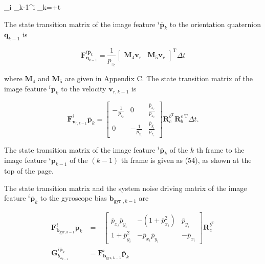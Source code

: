 _{i _{k-1}}^i _k=+ \Delta t


The state transition matrix of the image feature ${ }^i \overline{\mathbf{p}}_k$ to the orientation quaternion $\mathbf{q}_{k-1}$ is

$$
\mathbf{F}_{\mathbf{q}_{k-1}}^{i \overline{\mathbf{p}}_k}=\frac{1}{p_{z_c}}\left[\begin{array}{ll}
\mathbf{M}_4 \mathbf{v}_r & \mathbf{M}_5 \mathbf{v}_r
\end{array}\right]^{\mathrm{T}} \Delta t
$$

where $\mathbf{M}_4$ and $\mathbf{M}_5$ are given in Appendix C.
The state transition matrix of the image feature ${ }^i \overline{\mathbf{p}}_k$ to the velocity $\mathbf{v}_{r, k-1}$ is

$$
\mathbf{F}_{\mathbf{v}_{r, k-1}}^i \overline{\mathbf{p}}_k=\left[\begin{array}{ccc}
-\frac{1}{p_{z_c}} & 0 & \frac{\bar{p}_{x_i}}{p_{z_c}} \\
0 & -\frac{1}{p_{z_c}} & \frac{\bar{p}_{y_i}}{p_{z_c}}
\end{array}\right] \mathbf{R}_c^{b^{\mathrm{T}}} \mathbf{R}_b^{e \mathrm{~T}} \Delta t .
$$


The state transition matrix of the image feature ${ }^i \overline{\mathbf{p}}_k$ of the $k$ th frame to the image feature ${ }^i \overline{\mathbf{p}}_{k-1}$ of the $(k-1)$ th frame is given as (54), as shown at the top of the page.

The state transition matrix and the system noise driving matrix of the image feature ${ }^i \overline{\mathbf{p}}_k$ to the gyroscope bias $\mathbf{b}_{\text {gyr }, k-1}$ are

$$
\begin{aligned}
\mathbf{F}_{\mathbf{b}_{\mathrm{gyr}, k-1}}^i \overline{\mathbf{p}}_k & =-\left[\begin{array}{ccc}
\bar{p}_{x_i} \bar{p}_{y_i} & -\left(1+\bar{p}_{x_i}^2\right) & \bar{p}_{y_i} \\
1+\bar{p}_{y_i}^2 & -\bar{p}_{x_i} \bar{p}_{y_i} & -\bar{p}_{x_i}
\end{array}\right] \mathbf{R}_c^{b^{\mathrm{T}}} \\
\mathbf{G}_{b_{\omega_{k-1}}}^{i \overline{\mathbf{p}}_k} & =\mathbf{F}_{\mathbf{b}_{\mathrm{gyr}, k-1}}^i \overline{\mathbf{p}}_k
\end{aligned}
$$


